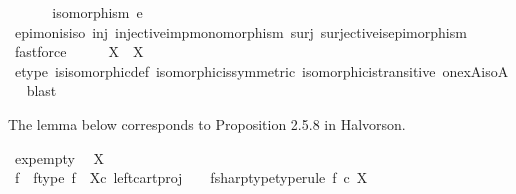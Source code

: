 \begin{isabellebody}
\ \ \isamarkupfalse%
\isanewline
\isanewline
\ \ \isamarkupfalse%
\ {\isachardoublequoteopen}isomorphism\ e{\isachardoublequoteclose}\isanewline
\ \ \ \ \isamarkupfalse%
\ epi{\isacharunderscore}{\kern0pt}mon{\isacharunderscore}{\kern0pt}is{\isacharunderscore}{\kern0pt}iso\ inj\ injective{\isacharunderscore}{\kern0pt}imp{\isacharunderscore}{\kern0pt}monomorphism\ surj\ surjective{\isacharunderscore}{\kern0pt}is{\isacharunderscore}{\kern0pt}epimorphism\ \isamarkupfalse%
\ fastforce\isanewline
\ \ \isamarkupfalse%
\ \isamarkupfalse%
\ {\isachardoublequoteopen}X\isactrlbsup {\isasymone}\isactrlesup \ {\isasymcong}\ X{\isachardoublequoteclose}\isanewline
\ \ \ \ \isamarkupfalse%
\ e{\isacharunderscore}{\kern0pt}type\ is{\isacharunderscore}{\kern0pt}isomorphic{\isacharunderscore}{\kern0pt}def\ isomorphic{\isacharunderscore}{\kern0pt}is{\isacharunderscore}{\kern0pt}symmetric\ isomorphic{\isacharunderscore}{\kern0pt}is{\isacharunderscore}{\kern0pt}transitive\ one{\isacharunderscore}{\kern0pt}x{\isacharunderscore}{\kern0pt}A{\isacharunderscore}{\kern0pt}iso{\isacharunderscore}{\kern0pt}A\ \isamarkupfalse%
\ blast\isanewline
{}\isamarkupfalse%
%
\endisatagproof
{\isafoldproof}%
%
\isadelimproof
%
\endisadelimproof
%
\begin{isamarkuptext}%
The lemma below corresponds to Proposition 2.5.8 in Halvorson.%
\end{isamarkuptext}\isamarkuptrue%
\isamarkupfalse%
\ exp{\isacharunderscore}{\kern0pt}empty{\isacharcolon}{\kern0pt}\isanewline
\ \ {\isachardoublequoteopen}X\isactrlbsup {\isasymemptyset}\isactrlesup \ {\isasymcong}\ {\isasymone}{\isachardoublequoteclose}\isanewline
%
\isadelimproof
%
\endisadelimproof
%
\isatagproof
{}\isamarkupfalse%
\ {\isacharminus}{\kern0pt}\ \isanewline
\ \ \isamarkupfalse%
\ f\ \ f{\isacharunderscore}{\kern0pt}type{\isacharcolon}{\kern0pt}\ {\isachardoublequoteopen}f\ {\isacharequal}{\kern0pt}\ {\isasymalpha}\isactrlbsub X\isactrlesub {\isasymcirc}\isactrlsub c\ {\isacharparenleft}{\kern0pt}left{\isacharunderscore}{\kern0pt}cart{\isacharunderscore}{\kern0pt}proj\ {\isasymemptyset}\ {\isasymone}{\isacharparenright}{\kern0pt}{\isachardoublequoteclose}\ \ fsharp{\isacharunderscore}{\kern0pt}type{\isacharbrackleft}{\kern0pt}type{\isacharunderscore}{\kern0pt}rule{\isacharbrackright}{\kern0pt}{\isacharcolon}{\kern0pt}\ {\isachardoublequoteopen}f\isactrlsup {\isasymsharp}\ {\isasymin}\isactrlsub c\ X\isactrlbsup {\isasymemptyset}\isactrlesup {\isachardoublequoteclose}\isanewline

\end{isabellebody}
